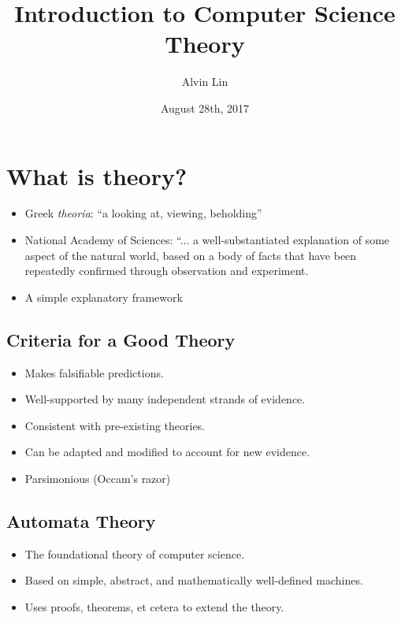 \documentclass[letterpaper, 12pt]{math}
\title{Introduction to Computer Science Theory}
\author{Alvin Lin}
\date{August 28th, 2017}
\begin{document}
\maketitle

\section*{What is theory?}
\begin{itemize}
  \item Greek \textit{theoria}: ``a looking at, viewing, beholding''
  \item National Academy of Sciences: ``... a well-substantiated
    explanation of some aspect of the natural world, based on a body of
    facts that have been repeatedly confirmed through observation and
    experiment.
  \item A simple explanatory framework
\end{itemize}

\subsection*{Criteria for a Good Theory}
\begin{itemize}
  \item Makes falsifiable predictions.
  \item Well-supported by many independent strands of evidence.
  \item Consistent with pre-existing theories.
  \item Can be adapted and modified to account for new evidence.
  \item Parsimonious (Occam's razor)
\end{itemize}

\subsection*{Automata Theory}
\begin{itemize}
  \item The foundational theory of computer science.
  \item Based on simple, abstract, and mathematically well-defined
    machines.
  \item Uses proofs, theorems, et cetera to extend the theory.
\end{itemize}
\end{document}
